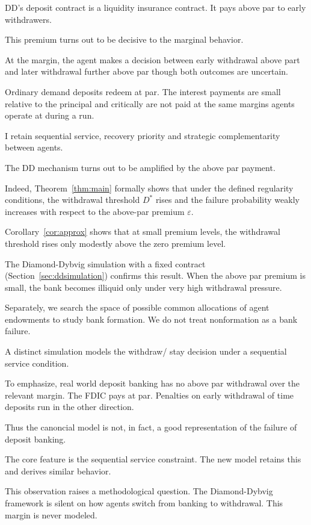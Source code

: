 \documentclass[12pt]{article}\usepackage[]{graphicx}\usepackage[]{xcolor}
\begin{document}
DD's deposit contract is a liquidity insurance contract. It pays above par to early withdrawers.

This premium turns out to be decisive to the marginal behavior.

At the margin, the agent makes a decision between early withdrawal above part and later withdrawal further above par though
both outcomes are uncertain.

Ordinary demand deposits redeem at par. The interest payments are small relative to the principal and critically are not
paid at the same margins agents operate at during a run. 

I retain sequential service, recovery priority and strategic complementarity between agents.

The DD mechanism turns out to be amplified by the above par payment.


Indeed, Theorem~\ref{thm:main} formally shows that under the defined regularity conditions, the withdrawal threshold $D^*$
rises and the failure probability weakly increases with respect to the above-par premium $\varepsilon$.


Corollary~\ref{cor:approx} shows that at small premium levels, the withdrawal threshold rises only modestly above the zero premium level.

The Diamond-Dybvig simulation with a fixed contract (Section~\ref{sec:ddsimulation}) confirms this result. When the 
above par premium is small, the bank becomes illiquid only under very high withdrawal pressure.



Separately, we search the space of possible common allocations of agent endowments to study bank formation. 
We do not treat nonformation as a bank failure. 

A distinct simulation models the withdraw/ stay decision under a sequential service condition.

To emphasize, real world deposit banking has no above par withdrawal over the relevant margin. The FDIC pays at par. 
Penalties on early withdrawal of time deposits run in the other direction.

Thus the canoncial model is not, in fact, a good representation of the failure of deposit banking.

The core feature is the sequential service constraint. The new model retains this and derives similar behavior.


This observation raises a methodological question. The Diamond-Dybvig framework is silent on how agents switch from
banking to withdrawal. This margin is never modeled. 
\end{document}

